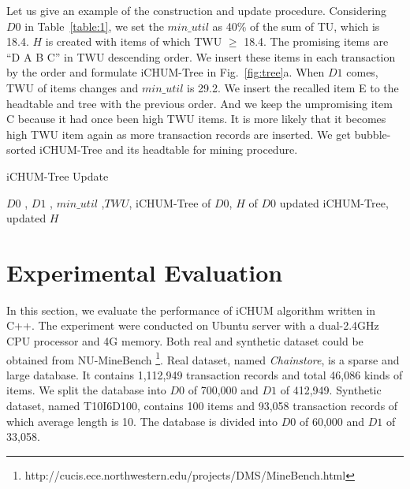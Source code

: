 \documentclass[runningheads,a4paper]{llncs}
\begin{document}
Let us give an example of the construction and update procedure. Considering $ D0 $ in Table~\ref{table:1}, we set the $ min\_util $ as 40\% of the sum of TU, which is 18.4. $ H $ is created with items of which TWU $ \geqslant $ 18.4. The promising items are ``D A B C'' in TWU descending order. We insert these items in each transaction by the order and formulate iCHUM-Tree in Fig.~\ref{fig:tree}a. When $ D1 $ comes, TWU of items changes and $ min\_util $ is 29.2. We insert the recalled item E to the headtable and tree with the previous order. And we keep the umpromising item C because it had once been high TWU items. It is more likely that it becomes high TWU item again as more transaction records are inserted. We get bubble-sorted iCHUM-Tree and its headtable for mining procedure. 

\begin{algorithm}
\caption{iCHUM-Tree Update}
\label{alg:update}
\begin{algorithmic}
\REQUIRE $ D0 $ , $ D1 $ ,  $ min\_util $ ,$ TWU $, iCHUM-Tree of $ D0 $, $ H $ of $ D0 $
\ENSURE  updated iCHUM-Tree, updated $ H $
\ENDFOR
{}

\end{algorithmic}
\end{algorithm}

\section{Experimental Evaluation}
In this section, we evaluate the performance of iCHUM algorithm written in C++. The experiment were conducted on Ubuntu server with a dual-2.4GHz CPU processor and 4G memory. Both real and synthetic dataset could be obtained from NU-MineBench \footnote{http://cucis.ece.northwestern.edu/projects/DMS/MineBench.html}. Real dataset, named \textit{Chainstore}, is a sparse and large database. It contains 1,112,949 transaction records and total 46,086 kinds of items. We split the database into $ D0 $ of 700,000 and $ D1 $ of 412,949. Synthetic dataset, named T10I6D100, contains 100 items and 93,058 transaction records of which average length is 10. The database is divided into $ D0 $ of 60,000 and $ D1 $ of 33,058.
\end{document}
